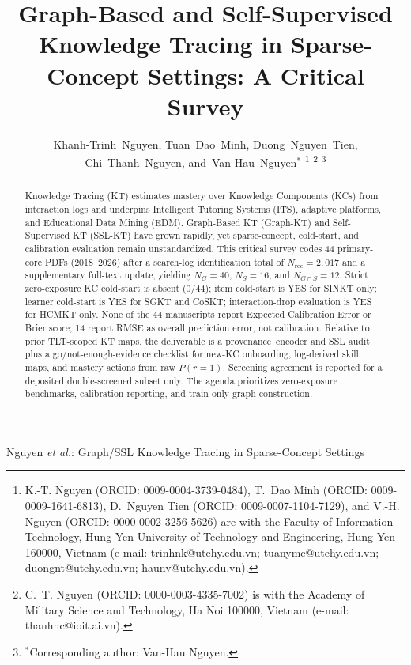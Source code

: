 \documentclass[lettersize,journal]{IEEEtran}
\begin{document}
\title{Graph-Based and Self-Supervised Knowledge Tracing in Sparse-Concept Settings: A Critical Survey}
\author{Khanh-Trinh~Nguyen,
        Tuan~Dao~Minh,
        Duong~Nguyen~Tien,
        Chi~Thanh~Nguyen,
        and~Van-Hau~Nguyen$^{*}$%
\thanks{K.-T. Nguyen (ORCID: 0009-0004-3739-0484),
T.~Dao Minh (ORCID: 0009-0009-1641-6813),
D.~Nguyen Tien (ORCID: 0009-0007-1104-7129),
and V.-H. Nguyen (ORCID: 0000-0002-3256-5626)
are with the Faculty of Information Technology,
Hung Yen University of Technology and Engineering, Hung Yen 160000, Vietnam
(e-mail: trinhnk@utehy.edu.vn; tuanymc@utehy.edu.vn;
duongnt@utehy.edu.vn; haunv@utehy.edu.vn).}%
\thanks{C.~T. Nguyen (ORCID: 0000-0003-4335-7002)
is with the Academy of Military Science and Technology, Ha Noi 100000, Vietnam
(e-mail: thanhnc@ioit.ai.vn).}%
\thanks{$^{*}$Corresponding author: Van-Hau Nguyen.}%
}
%
{Nguyen \MakeLowercase{\textit{et al.}}: Graph/SSL Knowledge Tracing in Sparse-Concept Settings}

\maketitle

\begin{abstract}
Knowledge Tracing (KT) estimates mastery over Knowledge Components (KCs) from interaction logs and underpins Intelligent Tutoring Systems (ITS), adaptive platforms, and Educational Data Mining (EDM). Graph-Based KT (Graph-KT) and Self-Supervised KT (SSL-KT) have grown rapidly, yet sparse-concept, cold-start, and calibration evaluation remain unstandardized. This critical survey codes 44 primary-core PDFs (2018--2026) after a search-log identification total of $N_{\mathrm{rec}}=2{,}017$ and a supplementary full-text update, yielding $N_G=40$, $N_S=16$, and $N_{G\cap S}=12$. Strict zero-exposure KC cold-start is absent ($0/44$); item cold-start is YES for SINKT only; learner cold-start is YES for SGKT and CoSKT; interaction-drop evaluation is YES for HCMKT only. None of the 44 manuscripts report Expected Calibration Error or Brier score; 14 report RMSE as overall prediction error, not calibration. Relative to prior TLT-scoped KT maps, the deliverable is a provenance--encoder and SSL audit plus a go/not-enough-evidence checklist for new-KC onboarding, log-derived skill maps, and mastery actions from raw $P(r=1)$. Screening agreement is reported for a deposited double-screened subset only. The agenda prioritizes zero-exposure benchmarks, calibration reporting, and train-only graph construction.
\end{abstract}
\end{document}
